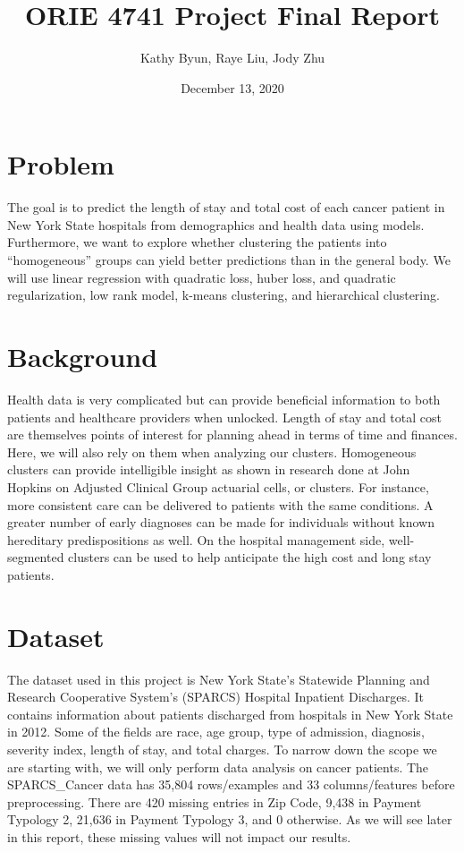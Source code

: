 \documentclass{article}
\title{ORIE 4741 \space \space Project Final Report}
\author{Kathy Byun, Raye Liu, Jody Zhu}
\date{December 13, 2020}
\begin{document}
\maketitle
\section{Problem}
The goal is to predict the length of stay and total cost of each cancer patient in New York State hospitals from demographics and health data using models. Furthermore, we want to explore whether clustering the patients into “homogeneous” groups can yield better predictions than in the general body. We will use linear regression with quadratic loss, huber loss, and quadratic regularization, low rank model, k-means clustering, and hierarchical clustering.
\newline

\section{Background}
Health data is very complicated but can provide beneficial information to both patients and healthcare providers when unlocked. Length of stay and total cost are themselves points of interest for planning ahead in terms of time and finances. Here, we will also rely on them when analyzing our clusters. Homogeneous clusters can provide intelligible insight as shown in research done at John Hopkins on Adjusted Clinical Group actuarial cells, or clusters. For instance, more consistent care can be delivered to patients with the same conditions. A greater number of early diagnoses can be made for individuals without known hereditary predispositions as well. On the hospital management side, well-segmented clusters can be used to help anticipate the high cost and long stay patients.
\newline

\section{Dataset}
The dataset used in this project is New York State’s Statewide Planning and Research Cooperative System’s (SPARCS) Hospital Inpatient Discharges. It contains information about patients discharged from hospitals in New York State in 2012. Some of the fields are race, age group, type of admission, diagnosis, severity index, length of stay, and total charges. To narrow down the scope we are starting with, we will only perform data analysis on cancer patients. The SPARCS\_Cancer data has 35,804 rows/examples and 33 columns/features before preprocessing. There are 420 missing entries in Zip Code, 9,438 in Payment Typology 2, 21,636 in Payment Typology 3, and 0 otherwise. As we will see later in this report, these missing values will not impact our results.
\newline
\end{document}

